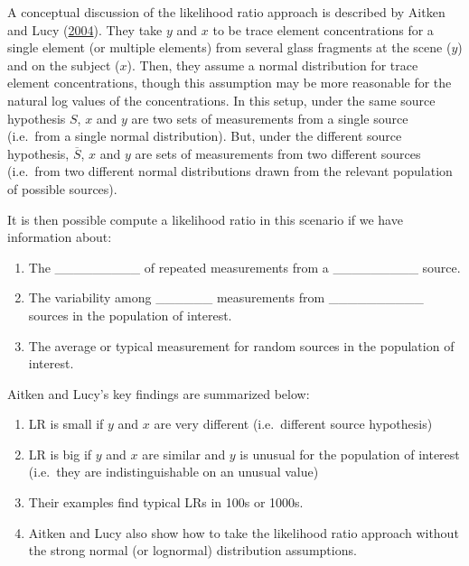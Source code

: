 \documentclass[]{book}
\providecommand{\tightlist}{%
  \setlength{\itemsep}{0pt}\setlength{\parskip}{0pt}}
\theoremstyle{definition}
\theoremstyle{definition}
\theoremstyle{remark}
\begin{document}
A conceptual discussion of the likelihood ratio approach is described by
Aitken and Lucy (\protect\hyperlink{ref-aitkenlucy}{2004}). They take
\(y\) and \(x\) to be trace element concentrations for a single element
(or multiple elements) from several glass fragments at the scene (\(y\))
and on the subject (\(x\)). Then, they assume a normal distribution for
trace element concentrations, though this assumption may be more
reasonable for the natural log values of the concentrations. In this
setup, under the same source hypothesis \(S\), \(x\) and \(y\) are two
sets of measurements from a single source (i.e.~from a single normal
distribution). But, under the different source hypothesis,
\(\overline{S}\), \(x\) and \(y\) are sets of measurements from two
different sources (i.e.~from two different normal distributions drawn
from the relevant population of possible sources).

It is then possible compute a likelihood ratio in this scenario if we
have information about:

\begin{enumerate}
\def\labelenumi{\arabic{enumi}.}
\tightlist
\item
  The \_\_\_\_\_\_\_\_\_ of repeated measurements from a
  \_\_\_\_\_\_\_\_\_ source. \vspace{.1in}
\item
  The variability among \_\_\_\_\_\_ measurements from
  \_\_\_\_\_\_\_\_\_\_ sources in the population of
  interest.\vspace{.1in}
\item
  The average or typical measurement for random sources in the
  population of interest.
\end{enumerate}

Aitken and Lucy's key findings are summarized below:

\begin{enumerate}
\def\labelenumi{\arabic{enumi}.}
\tightlist
\item
  LR is small if \(y\) and \(x\) are very different (i.e.~different
  source hypothesis)
\item
  LR is big if \(y\) and \(x\) are similar and \(y\) is unusual for the
  population of interest (i.e.~they are indistinguishable on an unusual
  value)
\item
  Their examples find typical LRs in 100s or 1000s.
\item
  Aitken and Lucy also show how to take the likelihood ratio approach
  without the strong normal (or lognormal) distribution assumptions.
\end{enumerate}
\end{document}
